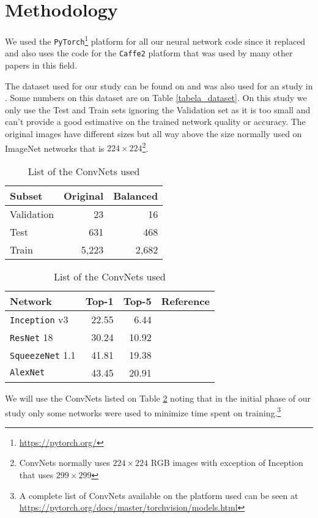 \documentclass[twocolumn]{article}
\newcommand{\mycite}{\cite}
\begin{document}
\section{Methodology}
We used the \texttt{PyTorch}\footnote{\url{https://pytorch.org/}} platform for all our neural network code since it replaced and also uses the code for the \texttt{Caffe2} platform that was used by many other papers in this field.

The dataset used for our study can be found on \mycite{Dataset} and was also used for an study in \mycite{Kermany2018}. Some numbers on this dataset are on Table \ref{tabela_dataset}. On this study we only use the Test and Train sets ignoring the Validation set as it is too small and can't provide a good estimative on the trained network quality or accuracy. The original images have different sizes but all way above the size normally used on ImageNet networks that is $224 \times 224$\footnote{ConvNets normally uses $224 \times 224$ RGB images with exception of Inception that uses $299 \times 299$}.

\begin{table}[ht]
\centering
\begin{tabular}{lrr}
Subset & Original & Balanced\\
\midrule
Validation & 23 & 16\\
Test & 631 & 468 \\
Train & 5,223 & 2,682 \\
\end{tabular}
\caption{Number of chest x-rays images in the dataset from \mycite{Dataset}}
\label{tabela_dataset}
\centering
\begin{tabular}{lrrr}
Network & Top-1 & Top-5 & Reference\\ 
\toprule
\texttt{Inception} v3 & 22.55 & 6.44 & \mycite{inception}\\
\texttt{ResNet} 18 & 30.24 & 10.92 & \mycite{resnet}\\
\texttt{SqueezeNet} 1.1 & 41.81 & 19.38 & \mycite{squeezenet}\\
\texttt{AlexNet} & 43.45 & 20.91 & \mycite{ImageNet}\\
\end{tabular}
\caption{List of the ConvNets used}
\label{tabela_convnets}
\end{table}

We will use the ConvNets listed on Table \ref{tabela_convnets} noting that in the initial phase of our study only some networks were used to minimize time spent on training.\footnote{A complete list of ConvNets available on the platform used can be seen at \url{https://pytorch.org/docs/master/torchvision/models.html}}
\end{document}
